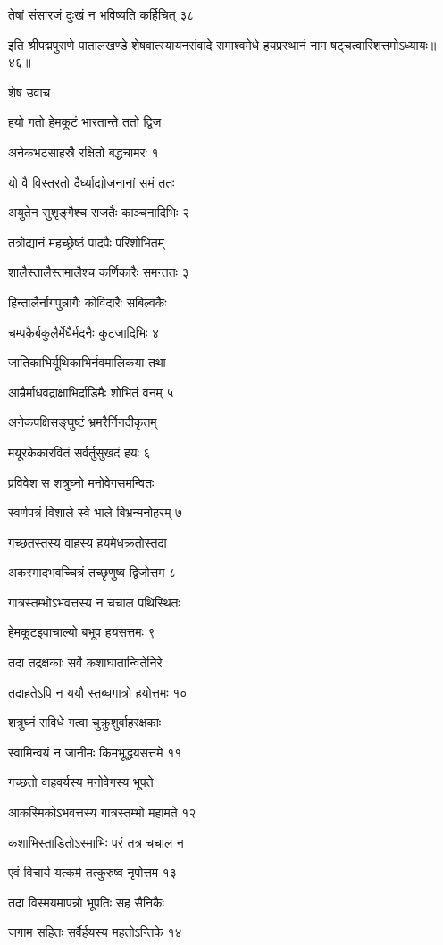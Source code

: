 तेषां संसारजं दुःखं न भविष्यति कर्हिचित् ३८

इति श्रीपद्मपुराणे पातालखण्डे शेषवात्स्यायनसंवादे रामाश्वमेधे हयप्रस्थानं नाम षट्चत्वारिंशत्तमोऽध्यायः॥४६॥


शेष उवाच

हयो गतो हेमकूटं भारतान्ते ततो द्विज

अनेकभटसाहस्रै रक्षितो बद्धचामरः १

यो वै विस्तरतो दैर्घ्याद्योजनानां समं ततः

अयुतेन सुशृङ्गैश्च राजतैः काञ्चनादिभिः २

तत्रोद्यानं महच्छ्रेष्ठं पादपैः परिशोभितम्

शालैस्तालैस्तमालैश्च कर्णिकारैः समन्ततः ३

हिन्तालैर्नागपुन्नागैः कोविदारैः सबिल्वकैः

चम्पकैर्बकुलैर्मेघैर्मदनैः कुटजादिभिः ४

जातिकाभिर्यूथिकाभिर्नवमालिकया तथा

आम्रैर्माधवद्राक्षाभिर्दाडिमैः शोभितं वनम् ५

अनेकपक्षिसङ्घुष्टं भ्रमरैर्निनदीकृतम्

मयूरकेकारवितं सर्वर्तुसुखदं हयः ६

प्रविवेश स शत्रुघ्नो मनोवेगसमन्वितः

स्वर्णपत्रं विशाले स्वे भाले बिभ्रन्मनोहरम् ७

गच्छतस्तस्य वाहस्य हयमेधक्रतोस्तदा

अकस्मादभवच्चित्रं तच्छृणुष्व द्विजोत्तम ८

गात्रस्तम्भोऽभवत्तस्य न चचाल पथिस्थितः

हेमकूटइवाचाल्यो बभूव हयसत्तमः ९

तदा तद्रक्षकाः सर्वे कशाघातान्वितेनिरे

तदाहतेऽपि न ययौ स्तब्धगात्रो हयोत्तमः १०

शत्रुघ्नं सविधे गत्वा चुक्रुशुर्वाहरक्षकाः

स्वामिन्वयं न जानीमः किमभूद्धयसत्तमे ११

गच्छतो वाहवर्यस्य मनोवेगस्य भूपते

आकस्मिकोऽभवत्तस्य गात्रस्तम्भो महामते १२

कशाभिस्ताडितोऽस्माभिः परं तत्र चचाल न

एवं विचार्य यत्कर्म तत्कुरुष्व नृपोत्तम १३

तदा विस्मयमापन्नो भूपतिः सह सैनिकैः

जगाम सहितः सर्वैर्हयस्य महतोऽन्तिके १४

